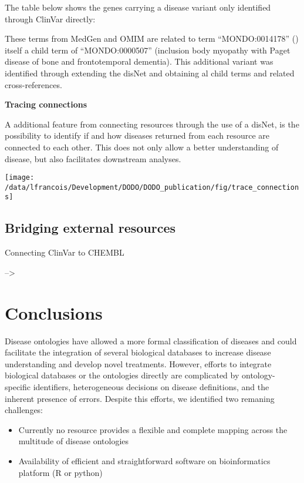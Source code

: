 \documentclass[9pt,a4paper,]{extarticle}
\begin{document}
The table below shows the genes carrying a disease variant only identified through ClinVar directly:

These terms from MedGen and OMIM are related to term ``MONDO:0014178'' () itself a child term of ``MONDO:0000507'' (inclusion body myopathy with Paget disease of bone and frontotemporal dementia). This additional variant was identified through extending the disNet and obtaining al child terms and related cross-references.

\textbf{Tracing connections}

A additional feature from connecting resources through the use of a disNet, is the possibility to identify if and how diseases returned from each resource are connected to each other. This does not only allow a better understanding of disease, but also facilitates downstream analyses.

\begin{center}\texttt{[image: /data/lfrancois/Development/DODO/DODO\_publication/fig/trace\_connections]} \end{center}

\hypertarget{bridging-external-resources}{%
\subsection{Bridging external resources}\label{bridging-external-resources}}

Connecting ClinVar to CHEMBL

--\textgreater{}

\hypertarget{conclusions}{%
\section{Conclusions}\label{conclusions}}

Disease ontologies have allowed a more formal classification of diseases and could facilitate the integration of several biological databases to increase disease understanding and develop novel treatments. However, efforts to integrate biological databases or the ontologies directly are complicated by ontology-specific identifiers, heterogeneous decisions on disease definitions, and the inherent presence of errors. Despite this efforts, we identified two remaning challenges:

\begin{itemize}
\item
  Currently no resource provides a flexible and complete mapping across the multitude of disease ontologies
\item
  Availability of efficient and straightforward software on bioinformatics platform (R or python)
\end{itemize}
\end{document}
